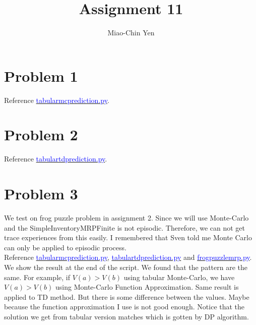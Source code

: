\documentclass{article}
\title{Assignment 11}
\author{Miao-Chin Yen}
\begin{document}
\maketitle

\section*{Problem 1}
Reference \href{https://github.com/miaochin/RL-book/tree/master/CME241_assignments/assignment11}{\textcolor{blue}{tabular\textunderscore mc\textunderscore prediction.py}}.
\section*{Problem 2}
Reference \href{https://github.com/miaochin/RL-book/tree/master/CME241_assignments/assignment11}{\textcolor{blue}{tabular\textunderscore td\textunderscore prediction.py}}.

\section*{Problem 3}
We test on frog puzzle problem in assignment 2. Since we will use Monte-Carlo and the SimpleInventoryMRPFinite is not episodic. Therefore,  we can not get trace experiences from this easily. I remembered that Sven told me Monte Carlo can only be applied to episodic process.\\
Reference   \href{https://github.com/miaochin/RL-book/tree/master/CME241_assignments/assignment11}{\textcolor{blue}{tabular\textunderscore mc\textunderscore prediction.py}}, \href{https://github.com/miaochin/RL-book/tree/master/CME241_assignments/assignment11}{\textcolor{blue}{tabular\textunderscore td\textunderscore prediction.py}} and \href{https://github.com/miaochin/RL-book/tree/master/CME241_assignments/assignment11}{\textcolor{blue}{frog\textunderscore puzzle\textunderscore mrp.py}}. We show the result at the end of the script. We found that the pattern are the same. For example, if $V(a) > V(b)$ using tabular Monte-Carlo, we have  $V(a) > V(b)$ using Monte-Carlo Function Approximation. Same result is applied to TD method. But there is some difference between the values. Maybe because the function approximation I use is not good enough. Notice that the solution we get from tabular version matches which is gotten by DP algorithm.
\end{document}
